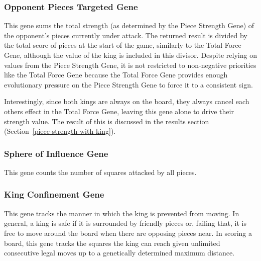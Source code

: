 \documentclass[letterpaper]{article}
\renewcommand{\_}{\allowbreak\textunderscore\allowbreak}
\begin{document}
\subsubsection{Opponent Pieces Targeted Gene}\label{opponent-pieces-targeted}
This gene sums the total strength (as determined by the Piece Strength Gene) of the opponent's pieces currently under attack. The returned result is divided by the total score of pieces at the start of the game, similarly to the Total Force Gene, although the value of the king is included in this divisor. Despite relying on values from the Piece Strength Gene, it is not restricted to non-negative priorities like the Total Force Gene because the Total Force Gene provides enough evolutionary pressure on the Piece Strength Gene to force it to a consistent sign.

Interestingly, since both kings are always on the board, they always cancel each others effect in the Total Force Gene, leaving this gene alone to drive their strength value. The result of this is discussed in the results section (Section~\ref{piece-strength-with-king}).

\subsubsection{Sphere of Influence Gene}
This gene counts the number of squares attacked by all pieces.

\subsubsection{King Confinement Gene}
This gene tracks the manner in which the king is prevented from moving. In general, a king is safe if it is surrounded by friendly pieces or, failing that, it is free to move around the board when there are opposing pieces near. In scoring a board, this gene tracks the squares the king can reach given unlimited consecutive legal moves up to a genetically determined maximum distance.
\end{document}

